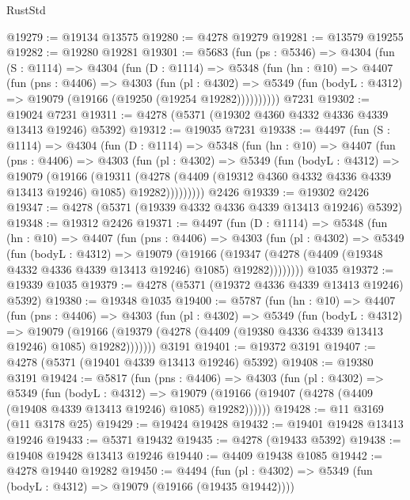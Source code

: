 \begin{lexlean}{RustStd}
\begin{coremodule}
@19279 := @19134 @13575
@19280 := @4278 @19279
@19281 := @13579 @19255
@19282 := @19280 @19281
@19301 := @5683
    (fun (ps : @5346) =>
    @4304
      (fun (S : @1114) =>
      @4304
        (fun (D : @1114) =>
        @5348
          (fun (hn : @10) =>
          @4407
            (fun (pns : @4406) =>
            @4303
              (fun (pl : @4302) =>
              @5349 (fun (bodyL : @4312) => @19079 (@19166 (@19250 (@19254 @19282))))))))))
    @7231
@19302 := @19024 @7231
@19311 := @4278 (@5371 (@19302 @4360 @4332 @4336 @4339 @13413 @19246) @5392)
@19312 := @19035 @7231
@19338 := @4497
    (fun (S : @1114) =>
    @4304
      (fun (D : @1114) =>
      @5348
        (fun (hn : @10) =>
        @4407
          (fun (pns : @4406) =>
          @4303
            (fun (pl : @4302) =>
            @5349
              (fun (bodyL : @4312) =>
              @19079
                (@19166
                  (@19311
                    (@4278
                      (@4409 (@19312 @4360 @4332 @4336 @4339 @13413 @19246) @1085)
                      @19282)))))))))
    @2426
@19339 := @19302 @2426
@19347 := @4278 (@5371 (@19339 @4332 @4336 @4339 @13413 @19246) @5392)
@19348 := @19312 @2426
@19371 := @4497
    (fun (D : @1114) =>
    @5348
      (fun (hn : @10) =>
      @4407
        (fun (pns : @4406) =>
        @4303
          (fun (pl : @4302) =>
          @5349
            (fun (bodyL : @4312) =>
            @19079
              (@19166
                (@19347 (@4278 (@4409 (@19348 @4332 @4336 @4339 @13413 @19246) @1085) @19282))))))))
    @1035
@19372 := @19339 @1035
@19379 := @4278 (@5371 (@19372 @4336 @4339 @13413 @19246) @5392)
@19380 := @19348 @1035
@19400 := @5787
    (fun (hn : @10) =>
    @4407
      (fun (pns : @4406) =>
      @4303
        (fun (pl : @4302) =>
        @5349
          (fun (bodyL : @4312) =>
          @19079
            (@19166 (@19379 (@4278 (@4409 (@19380 @4336 @4339 @13413 @19246) @1085) @19282)))))))
    @3191
@19401 := @19372 @3191
@19407 := @4278 (@5371 (@19401 @4339 @13413 @19246) @5392)
@19408 := @19380 @3191
@19424 := @5817
    (fun (pns : @4406) =>
    @4303
      (fun (pl : @4302) =>
      @5349
        (fun (bodyL : @4312) =>
        @19079 (@19166 (@19407 (@4278 (@4409 (@19408 @4339 @13413 @19246) @1085) @19282))))))
@19428 := @11 @3169 (@11 @3178 @25)
@19429 := @19424 @19428
@19432 := @19401 @19428 @13413 @19246
@19433 := @5371 @19432
@19435 := @4278 (@19433 @5392)
@19438 := @19408 @19428 @13413 @19246
@19440 := @4409 @19438 @1085
@19442 := @4278 @19440 @19282
@19450 := @4494
    (fun (pl : @4302) => @5349 (fun (bodyL : @4312) => @19079 (@19166 (@19435 @19442))))

\end{coremodule}
\end{lexlean}
